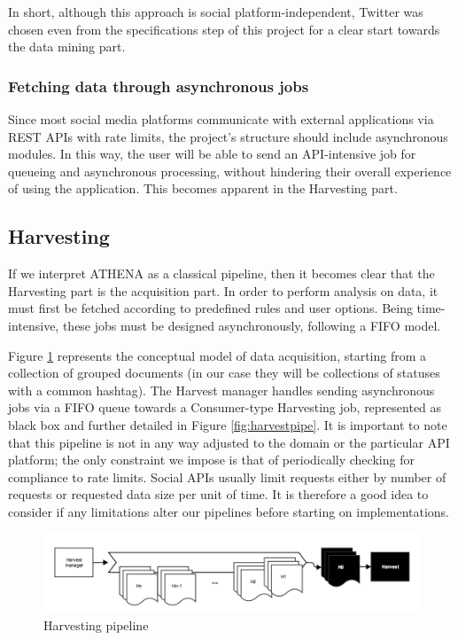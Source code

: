 \documentclass[12pt,a4paper,twoside]{report}
\begin{document}
In short, although this approach is social platform-independent, Twitter was chosen even from the specifications step of this project for a clear start towards the data mining part.

\subsubsection{Fetching data through asynchronous jobs}
Since most social media platforms communicate with external applications via REST APIs with rate limits, the project's structure should include asynchronous modules. In this way, the user will be able to send an API-intensive job for queueing and asynchronous processing, without hindering their overall experience of using the application. This becomes apparent in the Harvesting part.

\subsection{Harvesting}
If we interpret ATHENA as a classical pipeline, then it becomes clear that the Harvesting part is the acquisition part. In order to perform analysis on data, it must first be fetched according to predefined rules and user options. Being time-intensive, these jobs must be designed asynchronously, following a FIFO model.

Figure \ref{fig:harvestpipe1} represents the conceptual model of data acquisition, starting from a collection of grouped documents (in our case they will be collections of statuses with a common hashtag). The Harvest manager handles sending asynchronous jobs via a FIFO queue towards a Consumer-type Harvesting job, represented as black box and further detailed in Figure \ref{fig:harvestpipe}. It is important to note that this pipeline is not in any way adjusted to the domain or the particular API platform; the only constraint we impose is that of periodically checking for compliance to rate limits. Social APIs usually limit requests either by number of requests or requested data size per unit of time. It is therefore a good idea to consider if any limitations alter our pipelines before starting on implementations.

\begin{figure}[ht]
    \centering
\includegraphics[width=\columnwidth]{img/harvestpipe1.png}
    \caption{Harvesting pipeline}
    \label{fig:harvestpipe1}
\end{figure}
\end{document}
